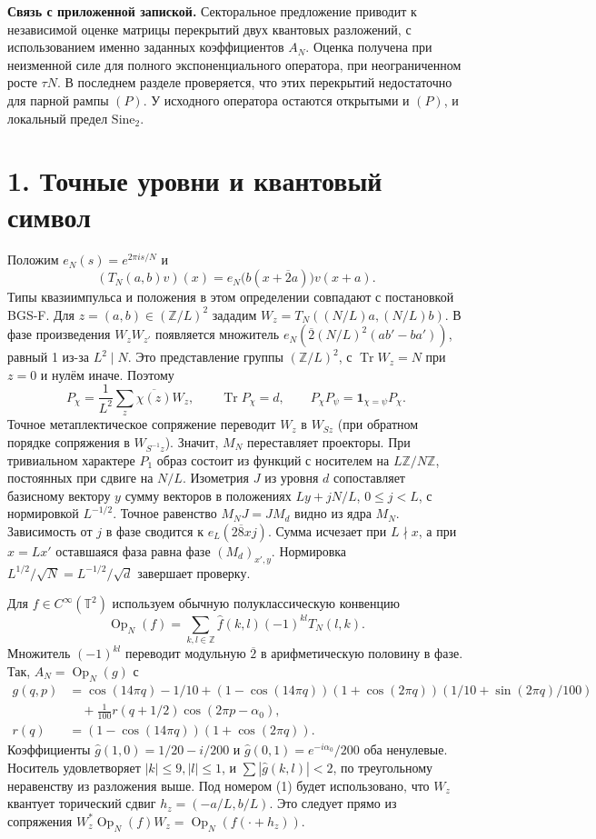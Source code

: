 \documentclass[11pt,a4paper]{article}
\newcommand{\Tr}{\operatorname{Tr}}
\newcommand{\Op}{\operatorname{Op}}
\newcommand{\T}{\mathbb{T}}
\newcommand{\Z}{\mathbb Z}
\newcommand{\sect}[1]{\section*{\sffamily\color{ink}#1}}
\newcommand{\subt}[1]{\par\medskip\noindent\textbf{#1.}\quad}
\begin{document}
\subt{Связь с приложенной запиской}
Секторальное предложение приводит к независимой оценке матрицы перекрытий двух квантовых разложений, с использованием именно заданных коэффициентов \(A_N\). Оценка получена при неизменной силе для полного экспоненциального оператора, при неограниченном росте \(\tau N\). В последнем разделе проверяется, что этих перекрытий недостаточно для парной рампы \((P)\). У исходного оператора остаются открытыми и \((P)\), и локальный предел \(\mathrm{Sine}_2\).

\newpage
\sect{1. Точные уровни и квантовый символ}
Положим \(e_N(s)=e^{2\pi i s/N}\) и
\[
 (T_N(a,b)v)(x)=e_N\big(b(x+\overline2 a)\big)v(x+a).
\]
Типы квазиимпульса и положения в этом определении совпадают с постановкой BGS-F. Для \(z=(a,b)\in(\Z/L)^2\) зададим \(W_z=T_N((N/L)a,(N/L)b)\). В фазе произведения \(W_zW_{z'}\) появляется множитель \(e_N(\overline2(N/L)^2(ab'-ba'))\), равный 1 из-за \(L^2\mid N\). Это представление группы \((\Z/L)^2\), с \(\Tr W_z=N\) при \(z=0\) и нулём иначе. Поэтому
\begin{equation}
   P_\chi=\frac1{L^2}\sum_z\overline{\chi(z)}W_z,\qquad
   \Tr P_\chi=d,\qquad P_\chi P_\psi=\mathbf1_{\chi=\psi}P_\chi.
                                                                  \tag{3}
\end{equation}
Точное метаплектическое сопряжение переводит \(W_z\) в \(W_{Sz}\) (при обратном порядке сопряжения в \(W_{S^{-1}z}\)). Значит, \(M_N\) переставляет проекторы. При тривиальном характере \(P_1\) образ состоит из функций с носителем на \(L\Z/N\Z\), постоянных при сдвиге на \(N/L\). Изометрия \(J\) из уровня \(d\) сопоставляет базисному вектору \(y\) сумму векторов в положениях \(Ly+jN/L\), \(0\le j<L\), с нормировкой \(L^{-1/2}\). Точное равенство \(M_NJ=JM_d\) видно из ядра \(M_N\). Зависимость от \(j\) в фазе сводится к \(e_L(2\overline8 xj)\). Сумма исчезает при \(L\nmid x\), а при \(x=Lx'\) оставшаяся фаза равна фазе \((M_d)_{x',y}\). Нормировка \(L^{1/2}/\sqrt N=L^{-1/2}/\sqrt d\) завершает проверку.

Для \(f\in C^\infty(\T^2)\) используем обычную полуклассическую конвенцию
\[
 \Op_N(f)=\sum_{k,l\in\Z}\widehat f(k,l)(-1)^{kl}T_N(l,k).
\]
Множитель \((-1)^{kl}\) переводит модульную \(\overline2\) в арифметическую половину в фазе. Так, \(A_N=\Op_N(g)\) с
\begin{align*}
 g(q,p)&=\cos(14\pi q)-1/10+
 (1-\cos(14\pi q))(1+\cos(2\pi q))
       (1/10+\sin(2\pi q)/100)\\
 &\quad+\tfrac1{100}r(q+1/2)\cos(2\pi p-\alpha_0),\\
 r(q)&=(1-\cos(14\pi q))(1+\cos(2\pi q)).
\end{align*}
Коэффициенты \(\widehat g(1,0)=1/20-i/200\) и
\(\widehat g(0,1)=e^{-i\alpha_0}/200\) оба ненулевые. Носитель удовлетворяет \(|k|\le9, |l|\le1\), и \(\sum |\widehat g(k,l)|<2\), по треугольному неравенству из разложения выше. Под номером (1) будет использовано, что \(W_z\) квантует торический сдвиг \(h_z=(-a/L,b/L)\). Это следует прямо из сопряжения \(W_z^*\Op_N(f)W_z=\Op_N(f(\cdot+h_z))\).
\end{document}

